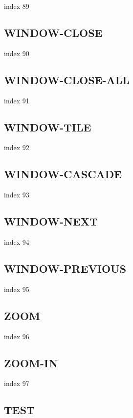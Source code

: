\documentclass[a4paper]{report}
\begin{document}
index 89

\subsection{WINDOW-CLOSE}

index 90

\subsection{WINDOW-CLOSE-ALL}

index 91

\subsection{WINDOW-TILE}

index 92

\subsection{WINDOW-CASCADE}

index 93

\subsection{WINDOW-NEXT}

index 94

\subsection{WINDOW-PREVIOUS}

index 95

\subsection{ZOOM}

 index 96

\subsection{ZOOM-IN}

index 97

\subsection{TEST}
\end{document}
